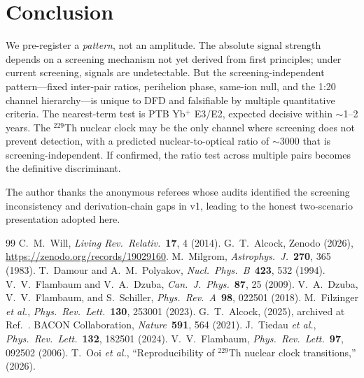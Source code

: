 \documentclass[aps,prd,twocolumn,superscriptaddress,floatfix]{revtex4-2}
\begin{document}
\section{Conclusion}
We pre-register a \textit{pattern}, not an amplitude. The absolute
signal strength depends on a screening mechanism not yet derived
from first principles; under current screening, signals are
undetectable. But the screening-independent pattern---fixed
inter-pair ratios, perihelion phase, same-ion null, and the 1:20
channel hierarchy---is unique to DFD and falsifiable by multiple
quantitative criteria. The nearest-term test is PTB Yb$^+$ E3/E2,
expected decisive within $\sim$1--2 years. The $^{229}$Th nuclear
clock may be the only channel where screening does not prevent
detection, with a predicted nuclear-to-optical ratio of $\sim\!3000$
that is screening-independent. If confirmed, the ratio test across
multiple pairs becomes the definitive discriminant.
\begin{acknowledgments}
The author thanks the anonymous referees whose audits identified
the screening inconsistency and derivation-chain gaps in v1,
leading to the honest two-scenario presentation adopted here.
\end{acknowledgments}
\begin{thebibliography}{99}
 C.~M.~Will,
\textit{Living Rev.\ Relativ.}\ \textbf{17}, 4 (2014).
 G.~T.~Alcock, Zenodo (2026),
\url{https://zenodo.org/records/19029160}.
 M.~Milgrom,
\textit{Astrophys.\ J.}\ \textbf{270}, 365 (1983).
 T.~Damour and A.~M.~Polyakov,
\textit{Nucl.\ Phys.\ B}\ \textbf{423}, 532 (1994).
 V.~V.~Flambaum and V.~A.~Dzuba,
\textit{Can.\ J.\ Phys.}\ \textbf{87}, 25 (2009).
 V.~A.~Dzuba, V.~V.~Flambaum, and S.~Schiller,
\textit{Phys.\ Rev.\ A}\ \textbf{98}, 022501 (2018).
 M.~Filzinger \textit{et al.},
\textit{Phys.\ Rev.\ Lett.}\ \textbf{130}, 253001 (2023).
 G.~T.~Alcock, (2025),
archived at Ref.~\cite{Alcock2026DFD}.
 BACON Collaboration,
\textit{Nature}\ \textbf{591}, 564 (2021).
 J.~Tiedau \textit{et al.},
\textit{Phys.\ Rev.\ Lett.}\ \textbf{132}, 182501 (2024).
 V.~V.~Flambaum,
\textit{Phys.\ Rev.\ Lett.}\ \textbf{97}, 092502 (2006).
 T.~Ooi \textit{et al.},
``Reproducibility of $^{229}$Th nuclear clock transitions,''
(2026).
\end{thebibliography}
\end{document}
